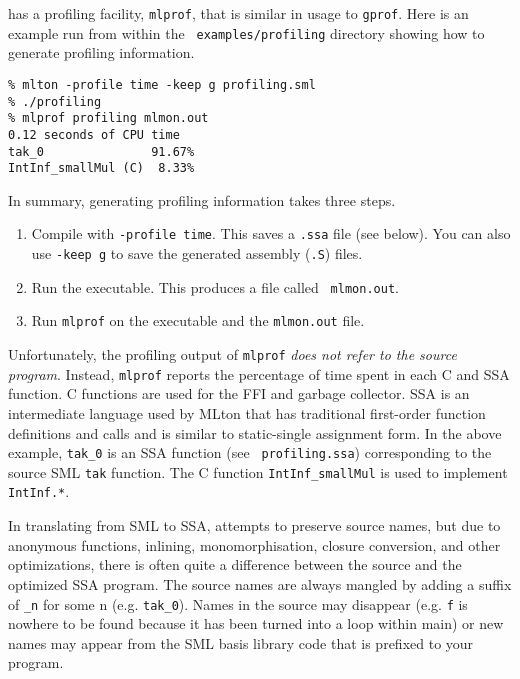 
{\mlton} has a profiling facility, {\tt mlprof}, that is similar in
usage to {\tt gprof}.  Here is an example run from within the {\tt
  examples/profiling} directory showing how to generate profiling
information.

\begin{verbatim}
% mlton -profile time -keep g profiling.sml
% ./profiling
% mlprof profiling mlmon.out
0.12 seconds of CPU time
tak_0               91.67%
IntInf_smallMul (C)  8.33%
\end{verbatim}
In summary, generating profiling information takes three steps.
\begin{enumerate}
  
\item Compile with {\tt -profile time}.  This saves a {\tt .ssa} file
  (see below).  You can also use {\tt -keep g} to save the generated
  assembly ({\tt .S}) files.
  
\item Run the executable.  This produces a file called {\tt
    mlmon.out}.
  
\item Run {\tt mlprof} on the executable and the {\tt mlmon.out} file.

\end{enumerate}
Unfortunately, the profiling output of {\tt mlprof} {\em
does not refer to the source program}.  Instead, {\tt mlprof} reports the
percentage of time spent in each C and SSA function.  C functions are
used for the FFI and garbage collector.  SSA is an intermediate
language used by MLton that has traditional first-order function
definitions and calls and is similar to static-single assignment form.
In the above example, {\tt tak\_0} is an SSA function (see {\tt
  profiling.ssa}) corresponding to the source SML {\tt tak} function.
The C function {\tt IntInf\_smallMul} is used to implement {\tt
  IntInf.*}.

In translating from SML to SSA, {\mlton} attempts to preserve source
names, but due to anonymous functions, inlining, monomorphisation,
closure conversion, and other optimizations, there is often quite a
difference between the source and the optimized SSA program.  The
source names are always mangled by adding a suffix of {\tt \_n} for
some n (e.g. {\tt tak\_0}).  Names in the source may disappear (e.g.
{\tt f} is nowhere to be found because it has been turned into a loop
within main) or new names may appear from the SML basis library code
that is prefixed to your program.

